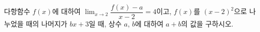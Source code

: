 다항함수 $f(x)$에 대하여 $\displaystyle\lim_{x\to 2}\dfrac{f(x)-a}{x-2}=4$이고, $f(x)$를 $(x-2)^2$으로 나누었을 때의 나머지가 $bx+3$일 때, 상수 $a$, $b$에 대하여 $a+b$의 값을 구하시오.
